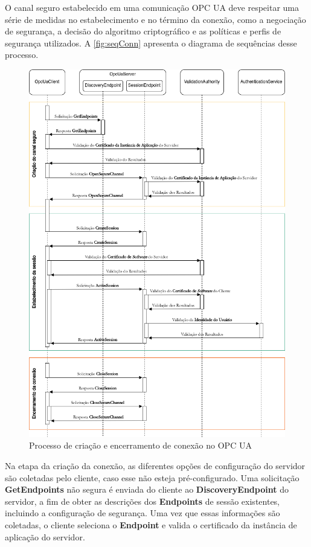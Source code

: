         O canal seguro estabelecido em uma comunicação OPC UA deve respeitar uma série de medidas no estabelecimento e no término da conexão, como a negociação de segurança, a decisão do algoritmo criptográfico e as políticas e perfis de segurança utilizados. A \autoref{fig:seqConn} apresenta o diagrama de sequências desse processo.

        \begin{figure}[htbp]
            \caption{Processo de criação e encerramento de conexão no OPC UA}
            \label{fig:seqConn}
            \begin{center}
                \includegraphics[width=0.972\linewidth]{USPSC-img/seqConn-low.png}
            \end{center}
        \end{figure}

        Na etapa da criação da conexão, as diferentes opções de configuração do servidor são coletadas pelo cliente, caso esse não esteja pré-configurado. Uma solicitação \textbf{GetEndpoints} não segura é enviada do cliente ao \textbf{DiscoveryEndpoint} do servidor, a fim de obter as descrições dos \textbf{Endpoints} de sessão existentes, incluindo a configuração de segurança. Uma vez que essas informações são coletadas, o cliente seleciona o \textbf{Endpoint} e valida o certificado da instância de aplicação do servidor. 
        
